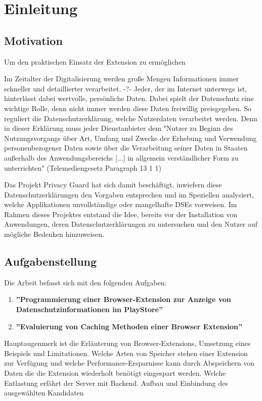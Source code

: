 \chapter{Einleitung}
\label{c:einleitung}

\section{Motivation}
\label{s:motivation}

Um den praktischen Einsatz der Extension zu ermöglichen

Im Zeitalter der Digitalisierung werden große Mengen Informationen immer schneller und detaillierter verarbeitet. -?-  Jeder, der im Internet unterwegs ist, hinterlässt dabei wertvolle, persönliche Daten. Dabei spielt der Datenschutz eine wichtige Rolle, denn nicht immer werden diese Daten freiwillig preisgegeben. So reguliert die Datenschutzerklärung, welche Nutzerdaten verarbeitet werden. Denn in dieser Erklärung muss jeder Dienstanbieter dem "Nutzer zu Beginn des Nutzungsvorgangs über Art, Umfang und Zwecke der Erhebung und Verwendung personenbezogener Daten sowie über die Verarbeitung seiner Daten in Staaten außerhalb des Anwendungsbereichs [...] in allgemein verständlicher Form zu unterrichten"  (Telemediengesetz Paragraph 13 1 1)

Das Projekt Privacy Guard hat sich damit beschäftigt, inwiefern diese Datenschutzerklärungen den Vorgaben entsprechen und im Speziellen analysiert, welche Applikationen unvollständige oder mangelhafte DSEs vorweisen. Im Rahmen dieses Projektes entstand die Idee, bereits vor der Installation von Anwendungen, deren Datenschutzerklärungen zu untersuchen und den Nutzer auf mögliche Bedenken hinzuweisen.

\section{Aufgabenstellung}
\label{s:aufgabenstellung}

Die Arbeit befasst sich mit den folgenden Aufgaben:
\begin{enumerate}
	\item \textbf{''Programmierung einer Browser-Extension zur Anzeige von Datenschutzinformationen im PlayStore''}
	\item \textbf{''Evaluierung von Caching Methoden einer Browser Extension''}
\end{enumerate}

Hauptaugenmerk ist die Erläuterung von Browser-Extensions, Umsetzung eines Beispiels und Limitationen.
Welche Arten von Speicher stehen einer Extension zur Verfügung und welche Performance-Ersparnisse kann durch Abspeichern von Daten die die Extension wiederholt benötigt eingespart werden. Welche Entlastung erfährt der Server mit Backend. Aufbau und Einbindung des ausgewählten Kandidaten


